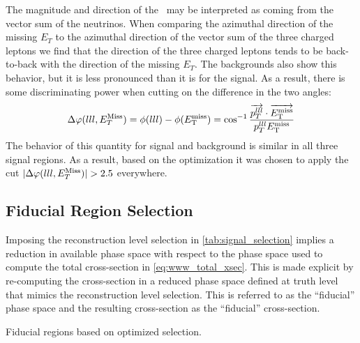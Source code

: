 The magnitude and direction
of the \MET~may be interpreted as coming from the 
vector sum of the neutrinos.  
When comparing the azimuthal direction 
of the missing $E_{T}$ to the azimuthal direction of the vector
sum of the three charged leptons
we find that 
the direction of the three charged leptons
tends to be back-to-back with the direction of the 
missing $E_{T}$. The
backgrounds also show this behavior, but it is less pronounced than 
it is for the signal.  As a result, 
there is some discriminating power when cutting on the difference 
in the two angles: 
\begin{equation}
\Delta\varphi(lll,E_{T}^{\textrm{Miss}}) = \phi(lll)-\phi(E_{\mathrm{T}}^{\mathrm{miss}}) = \cos^{-1}\frac{ \overrightarrow{p_{T}^{lll}}\cdot\overrightarrow{E_{\mathrm{T}}^{\mathrm{miss}}} }{ p_{T}^{lll}E_{\mathrm{T}}^{\mathrm{miss}} } 
\end{equation}
The behavior of this quantity for signal and
background is similar in all three signal regions.
As a result, based on the 
optimization it was chosen to apply the cut
$|\Delta\varphi(lll,E_{T}^{\textrm{Miss}})| > 2.5$ everywhere.  



\subsection{Fiducial Region Selection}
\label{sec:fiducial}

Imposing the reconstruction level selection in \tab\ref{tab:signal_selection}
implies a reduction in available phase space with respect to the 
phase space
used to compute the total cross-section in \eqn\eqref{eq:www_total_xsec}.
This is made explicit by re-computing the cross-section in a reduced
phase space defined at truth level that mimics the reconstruction
level selection. This is referred to as the ``fiducial'' phase space
and the resulting cross-section as the ``fiducial'' cross-section.



\begin{table}[tb]
\centering
\begin{small}

\end{small}
\caption{Fiducial regions based on optimized selection.}
\label{tab:fiducial_selection}
\end{table}

